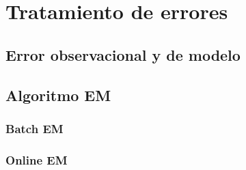 \chapter{Tratamiento de errores}
\section{Error observacional y de modelo}
\section{Algoritmo EM}
\subsection{Batch EM}
\subsection{Online EM}
